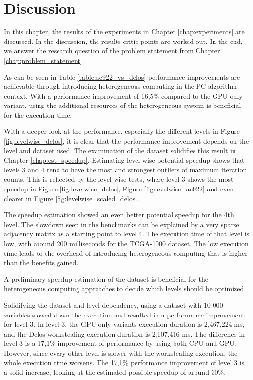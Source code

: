 \chapter{Discussion}
\label{chap:discussion}
In this chapter, the results of the experiments in Chapter \ref{chap:experiments} are discussed. In the discussion, the results critic points are worked out. In the end, we answer the research question of the problem statement from Chapter \ref{chap:problem_statement}.

% 
As can be seen in Table \ref{table:ac922_vs_delos} performance improvements are achievable through introducing heterogeneous computing in the PC algorithm context. With a performance improvement of 16,5\% compared to the GPU-only variant, using the additional resources of the heterogeneous system is beneficial for the execution time.

With a deeper look at the performance, especially the different levels in Figure \ref{fig:levelwise_delos}, it is clear that the performance improvement depends on the level and dataset used. The examination of the dataset solidifies this result in Chapter \ref{chap:est_speedup}. Estimating level-wise potential speedup shows that levels 3 and 4 tend to have the most and strongest outliers of maximum iteration counts. This is reflected by the level-wise tests, where level 3 shows the most speedup in Figure \ref{fig:levelwise_delos}, Figure \ref{fig:levelwise_ac922} and even clearer in Figure \ref{fig:levelwise_scaled_delos}.

The speedup estimation showed an even better potential speedup for the 4th level. The slowdown seen in the benchmarks can be explained by a very sparse adjacency matrix as a starting point to level 4. The execution time of that level is low, with around 200 milliseconds for the TCGA-1000 dataset. The low execution time leads to the overhead of introducing heterogeneous computing that is higher than the benefits gained.

A preliminary speedup estimation of the dataset is beneficial for the heterogeneous computing approaches to decide which levels should be optimized.

Solidifying the dataset and level dependency, using a dataset with 10 000 variables slowed down the execution and resulted in a performance improvement for level 3. In level 3, the GPU-only variants execution duration is 2,467,224 ms, and the Delos workstealing execution duration is 2,107,416 ms.
The difference in level 3 is a 17,1\% improvement of performance by using both CPU and GPU. However, since every other level is slower with the workstealing execution, the whole execution time worsens. The 17,1\% performance improvement of level 3 is a solid increase, looking at the estimated possible speedup of around 30\%.


